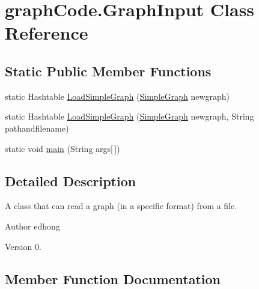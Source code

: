 \hypertarget{classgraphCode_1_1GraphInput}{}\section{graph\+Code.\+Graph\+Input Class Reference}
\label{classgraphCode_1_1GraphInput}
\subsection*{Static Public Member Functions}
\begin{DoxyCompactItemize}
\item 
static Hashtable \hyperlink{classgraphCode_1_1GraphInput_a3e601808e53150db545cdaa441965c70}{Load\+Simple\+Graph} (\hyperlink{classgraphCode_1_1SimpleGraph}{Simple\+Graph} newgraph)
\item 
static Hashtable \hyperlink{classgraphCode_1_1GraphInput_ac47885774b3b789cc1202785807351f8}{Load\+Simple\+Graph} (\hyperlink{classgraphCode_1_1SimpleGraph}{Simple\+Graph} newgraph, String pathandfilename)
\item 
static void \hyperlink{classgraphCode_1_1GraphInput_afea873aaf28e3b6795bd293c5bfcb7c8}{main} (String args\mbox{[}$\,$\mbox{]})
\end{DoxyCompactItemize}


\subsection{Detailed Description}
A class that can read a graph (in a specific format) from a file.

\begin{DoxyAuthor}{Author}
edhong 
\end{DoxyAuthor}
\begin{DoxyVersion}{Version}
0. 
\end{DoxyVersion}


\subsection{Member Function Documentation}
